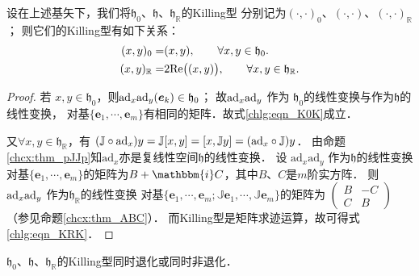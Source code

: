 \begin{proposition}
	设在上述基矢下，我们将$\mathfrak{h}_{0}$、$\mathfrak{h}$、$\mathfrak{h}_{\mathbb{R}}$的Killing型
	分别记为$(\cdot,\cdot)_0$、$(\cdot,\cdot)$、$(\cdot,\cdot)_{\mathbb{R}}$；
	则它们的Killing型有如下关系：
	\begin{align}
		(x,y)_0 =& (x,y),\qquad \forall x,y \in \mathfrak{h}_{0}. \label{chlg:eqn_K0K} \\
		(x,y)_{\mathbb{R}} =& 2{\rm Re}\bigl((x,y)\bigr),\qquad 
		\forall x,y \in \mathfrak{h}_{\mathbb{R}}. \label{chlg:eqn_KRK}
	\end{align}    
\end{proposition}
\begin{proof}
若 $x, y \in \mathfrak{h}_0$，则${\rm ad}_x \mathrm{ad}_y (\boldsymbol{e}_k) \in \mathfrak{h}_0$；
故${\rm ad}_x \mathrm{ad}_y$ 作为 $\mathfrak{h}_0$的线性变换与作为$\mathfrak{h}$的线性变换，
对基$\{\boldsymbol{e}_1,\cdots,\boldsymbol{e}_m\}$有相同的矩阵．故式\eqref{chlg:eqn_K0K}成立．

又$\forall x, y \in \mathfrak{h}_{\mathbb{R}}$，有
$(\mathbb{J}\circ {\rm ad}_x) y=\mathbb{J}[x, y]=[x, \mathbb{J} y]=({\rm ad}_x \circ \mathbb{J}) y $．
由命题\ref{chcx:thm_pJJp}知$\mathrm{ad}_x$亦是复线性空间$\mathfrak{h}$的线性变换．
设 $\mathrm{ad}_x \mathrm{ad}_y$ 作为$\mathfrak{h}$的线性变换
对基$\{\boldsymbol{e}_1,\cdots,\boldsymbol{e}_m\}$的矩阵为$B+\mathbbm{i}C$，其中$B$、$C$是$m$阶实方阵．
则${\rm ad}_x \mathrm{ad}_y$ 作为$\mathfrak{h}_{\mathbb{R}}$的线性变换
对基$\{\boldsymbol{e}_1,\cdots,\boldsymbol{e}_m;\mathbb{J}\boldsymbol{e}_1,\cdots,\mathbb{J}\boldsymbol{e}_m\}$的矩阵为
$    \left(\begin{smallmatrix}
    B& -C \\ C & B
\end{smallmatrix}\right)$（参见命题\ref{chcx:thm_ABC}）．
而Killing型是矩阵求迹运算，故可得式\eqref{chlg:eqn_KRK}．
\end{proof}

\begin{proposition}\label{chlg:thm_h0hhR}
    $\mathfrak{h}_0$、$ \mathfrak{h}$、$ \mathfrak{h}_{\mathbb{R}}$的Killing型同时退化或同时非退化．
\end{proposition}

